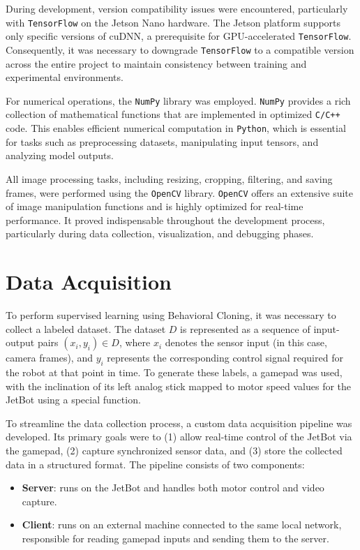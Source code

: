 During development, version compatibility issues were encountered, particularly with \texttt{TensorFlow} on the Jetson Nano hardware. The Jetson platform supports only specific versions of cuDNN, a prerequisite for GPU-accelerated \texttt{TensorFlow}. Consequently, it was necessary to downgrade \texttt{TensorFlow} to a compatible version across the entire project to maintain consistency between training and experimental environments.

For numerical operations, the \texttt{NumPy} library was employed. \texttt{NumPy} provides a rich collection of mathematical functions that are implemented in optimized \texttt{C/C++} code. This enables efficient numerical computation in \texttt{Python}, which is essential for tasks such as preprocessing datasets, manipulating input tensors, and analyzing model outputs.

All image processing tasks, including resizing, cropping, filtering, and saving frames, were performed using the \texttt{OpenCV} library. \texttt{OpenCV} offers an extensive suite of image manipulation functions and is highly optimized for real-time performance. It proved indispensable throughout the development process, particularly during data collection, visualization, and debugging phases.

\section{Data Acquisition}

To perform supervised learning using Behavioral Cloning, it was necessary to collect a labeled dataset. The dataset \( D \) is represented as a sequence of input-output pairs \( (x_i, y_i) \in D \), where \( x_i \) denotes the sensor input (in this case, camera frames), and \( y_i \) represents the corresponding control signal required for the robot at that point in time. To generate these labels, a gamepad was used, with the inclination of its left analog stick mapped to motor speed values for the JetBot using a special function.

To streamline the data collection process, a custom data acquisition pipeline was developed. Its primary goals were to (1) allow real-time control of the JetBot via the gamepad, (2) capture synchronized sensor data, and (3) store the collected data in a structured format. The pipeline consists of two components:

\begin{itemize}
  \item \textbf{Server}: runs on the JetBot and handles both motor control and video capture.
  \item \textbf{Client}: runs on an external machine connected to the same local network, responsible for reading gamepad inputs and sending them to the server.
\end{itemize}

